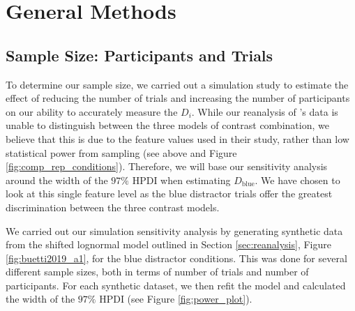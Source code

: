 \documentclass[preprint,12pt,authoryear]{elsarticle}
\begin{document}
\section{General Methods}

\subsection{Sample Size: Participants and Trials}

To determine our sample size, we carried out a simulation study to estimate the effect of reducing the number of trials and increasing the number of participants on our ability to accurately measure the $D_i$. While our reanalysis of \cite{buetti2019predicting}'s data is unable to distinguish between the three models of contrast combination, we believe that this is due to the feature values used in their study, rather than low statistical power from sampling (see above and Figure \ref{fig:comp_rep_conditions}). Therefore, we will base our sensitivity analysis around the width of the $97\%$ HPDI when estimating $D_{\text{blue}}$. We have chosen to look at this single feature level as the blue distractor trials offer the greatest discrimination between the three contrast models.

We carried out our simulation sensitivity analysis by generating synthetic data from the shifted lognormal model outlined in Section \ref{sec:reanalysis}, Figure \ref{fig:buetti2019_a1}, for the blue distractor conditions. This was done for several different sample sizes, both in terms of number of trials and number of participants. For each synthetic dataset, we then refit the model and calculated the width of the $97\%$ HPDI (see Figure \ref{fig:power_plot}).
\end{document}
